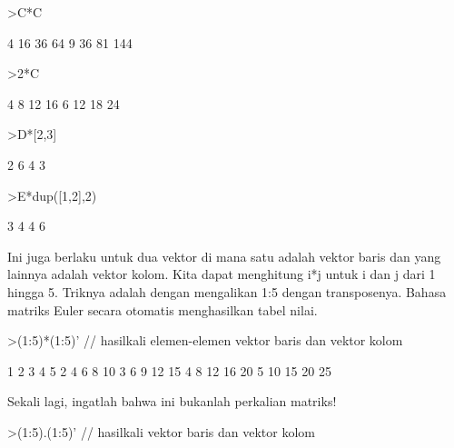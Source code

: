 \documentclass[12pt,arial,letterpaper]{book}
\begin{document}
\begin{eulercomment}
\begin{eulercomment}
\begin{eulerprompt}
>C*C
\end{eulerprompt}
\begin{euleroutput}
              4            16            36            64 
              9            36            81           144 
\end{euleroutput}
\begin{eulerprompt}
>2*C
\end{eulerprompt}
\begin{euleroutput}
              4             8            12            16 
              6            12            18            24 
\end{euleroutput}
\begin{eulerprompt}
>D*[2,3]
\end{eulerprompt}
\begin{euleroutput}
              2             6 
              4             3 
\end{euleroutput}
\begin{eulerprompt}
>E*dup([1,2],2)
\end{eulerprompt}
\begin{euleroutput}
              3             4 
              4             6 
\end{euleroutput}
\begin{eulercomment}
Ini juga berlaku untuk dua vektor di mana satu adalah vektor baris dan
yang lainnya adalah vektor kolom. Kita dapat menghitung i*j untuk i
dan j dari 1 hingga 5. Triknya adalah dengan mengalikan 1:5 dengan
transposenya. Bahasa matriks Euler secara otomatis menghasilkan tabel
nilai.
\end{eulercomment}
\begin{eulerprompt}
>(1:5)*(1:5)' // hasilkali elemen-elemen vektor baris dan vektor kolom
\end{eulerprompt}
\begin{euleroutput}
              1             2             3             4             5 
              2             4             6             8            10 
              3             6             9            12            15 
              4             8            12            16            20 
              5            10            15            20            25 
\end{euleroutput}
\begin{eulercomment}
Sekali lagi, ingatlah bahwa ini bukanlah perkalian matriks!
\end{eulercomment}
\begin{eulerprompt}
>(1:5).(1:5)' // hasilkali vektor baris dan vektor kolom

\end{eulerprompt}
\end{eulercomment}
\end{eulercomment}
\end{document}
